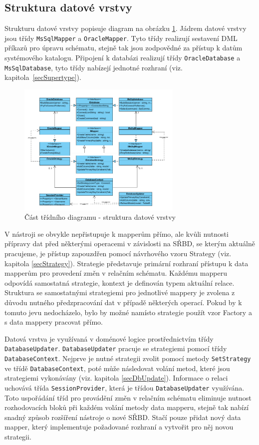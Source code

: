 \documentclass[czech,bachelor,public,dept460,male,oneside]{diploma}
\begin{document}
		
	\subsection{Struktura datové vrstvy}
	Strukturu datové vrstvy popisuje diagram na obrázku \ref{fig:classDiagSync}. Jádrem datové vrstvy jsou třídy \texttt{MsSqlMapper} a \texttt{OracleMapper}. Tyto třídy realizují sestavení DML příkazů pro úpravu schématu, stejně tak jsou zodpovědné za přístup k datům systémového katalogu. Připojení k databázi realizují třídy \texttt{OracleDatabase} a \texttt{MsSqlDatabase}, tyto třídy nabízejí jednotné rozhraní (viz. kapitola~\ref{secSupertype}). 
	
	\begin{figure}[H]
		\centering
		\includegraphics[width=0.70\textwidth]{Figures/EditorSync}
		\caption{Část třídního diagramu - struktura datové vrstvy}
		\label{fig:classDiagSync}
	\end{figure}
	
	V nástroji se obvykle nepřistupuje k mapperům přímo, ale kvůli nutnosti přípravy dat před některými operacemi v závislosti na SŘBD, se kterým aktuálně pracujeme, je přístup zapouzdřen pomocí návrhového vzoru Strategy (viz. kapitola \ref{secStrategy}). Strategie představuje primární rozhraní přístupu k data mapperům pro provedení změn v relačním schématu. Každému mapperu odpovídá samostatná strategie, kontext je definován typem aktuální relace. Struktura se samostatnými strategiemi pro jednotlivé mappery je zvolena z důvodu nutného předzpracování dat v případě některých operací. Pokud by k tomuto jevu nedocházelo, bylo by možné namísto strategie použít vzor Factory a s data mappery pracovat přímo. 
	
	Datová vrstva je využívaná v doménové logice prostřednictvím třídy \texttt{DatabaseUpdater}. \texttt{DatabaseUpdater} pracuje se strategiemi pomocí třídy \texttt{DatabaseContext}. Nejprve je nutné strategii zvolit pomocí metody \texttt{SetStrategy} ve třídě \texttt{DatabaseContext}, poté může následovat volání metod, které jsou strategiemi vykonávány (viz. kapitola \ref{secDbUpdate}). Informace o relaci uchovává třída \texttt{SessionProvider}, která je třídou \texttt{DatabaseUpdater} využívána. Toto uspořádání tříd pro provádění změn v relačním schématu eliminuje nutnost rozhodovacích bloků při každém volání metody data mapperu, stejně tak nabízí snadný způsob rozšíření nástroje o nové SŘBD. Stačí pouze přidat nový data mapper, který implementuje požadované rozhraní a vytvořit pro něj novou strategii.
	
\end{document}
